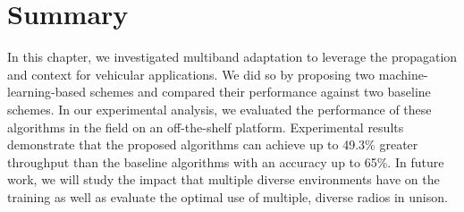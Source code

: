\section{Summary}
\label{sec:vncsummary}


In this chapter, we investigated multiband adaptation to leverage the propagation and context for vehicular applications. 
We did so by proposing two machine-learning-based schemes and compared their
performance against two baseline schemes.
In our experimental analysis, we evaluated the performance of these algorithms 
in the field on an off-the-shelf platform.
Experimental results demonstrate that the proposed algorithms can 
achieve up to 49.3\% greater throughput than the baseline algorithms
with an accuracy up to 65\%. In future work, we will study the impact that
multiple diverse environments have on the training as well as evaluate
the optimal use of multiple, diverse radios in unison.
